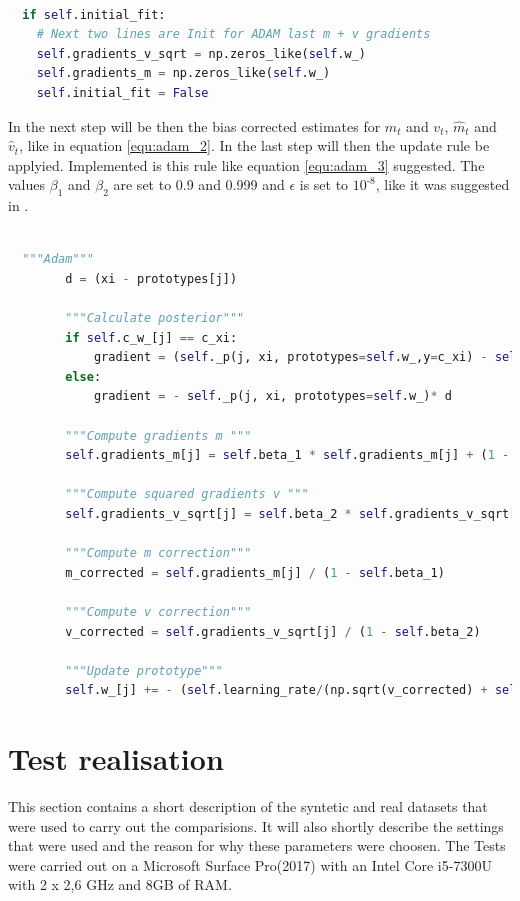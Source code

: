 \documentclass[12pt,oneside,a4paper,parskip]{scrbook}
\begin{document}
\begin{lstlisting}[label=lst:adam,
  language=python,
  firstnumber=1,
  caption= Modification of the \texttt{\_optimize} method to initialize $m_t$ and $v_t$.]			   

  if self.initial_fit:
    # Next two lines are Init for ADAM last m + v gradients
    self.gradients_v_sqrt = np.zeros_like(self.w_)
    self.gradients_m = np.zeros_like(self.w_)
    self.initial_fit = False
\end{lstlisting}

In the next step will be then the bias corrected estimates for $m_t$ and $v_t$, $\hat{m}_t$ and $\hat{v}_t$,
like in equation \ref{equ:adam_2}. 
In the last step will then the update rule be applyied. Implemented is this rule like equation \ref{equ:adam_3} suggested.
The values $\beta_1$ and $\beta_2$ are set to 0.9 and 0.999 and $\epsilon$ is set to $10^\textit{-8}$, like it was suggested in \cite{overvieDiffRSLVQ, Kingma2014AdamAM}.

\begin{lstlisting}[label=lst:adam,
  language=python,
  firstnumber=1,
  caption= Implementation of Adam on basis of \cite{PassiveDriftonRSLVQ}.]			   

  """Adam"""
        d = (xi - prototypes[j])

        """Calculate posterior"""
        if self.c_w_[j] == c_xi:
            gradient = (self._p(j, xi, prototypes=self.w_,y=c_xi) - self._p(j, xi, prototypes=self.w_))* d
        else:
            gradient = - self._p(j, xi, prototypes=self.w_)* d

        """Compute gradients m """
        self.gradients_m[j] = self.beta_1 * self.gradients_m[j] + (1 - self.beta_1) * gradient

        """Compute squared gradients v """
        self.gradients_v_sqrt[j] = self.beta_2 * self.gradients_v_sqrt[j] + (1 - self.beta_2) * gradient ** 2 

        """Compute m correction"""
        m_corrected = self.gradients_m[j] / (1 - self.beta_1)

        """Compute v correction"""
        v_corrected = self.gradients_v_sqrt[j] / (1 - self.beta_2)

        """Update prototype"""
        self.w_[j] += - (self.learning_rate/(np.sqrt(v_corrected) + self.epsilon ))*m_corrected
\end{lstlisting}

\chapter{Test realisation}
This section contains a short description of the syntetic and real datasets that were used to carry out the comparisions.
It will also shortly describe the settings that were used and the reason for why these parameters were choosen.
The Tests were carried out on a Microsoft Surface Pro(2017) with an Intel Core i5-7300U with 2 x 2,6 GHz and 8GB of RAM.
\end{document}

